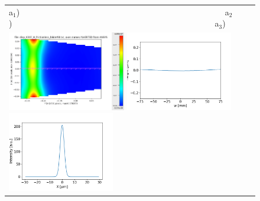 \documentclass[]{spie}  %
\begin{document}
\newpage 

   \begin{figure} [ht]
  \begin{center}
   \begin{tabular}{l} 
   a$_1$)~~~~~~~~~~~~~~~~~~~~~~~~~~~~~~~~~~~~~~~~~~~~~~~~~
   a$_2$)~~~~~~~~~~~~~~~~~~~~~~~~~~~~~~~~~~~~~~~~~~~~~~~~~a$_3$)\\
   \includegraphics[height=3.5cm]{figures/cryogenic2d.png} 
   \includegraphics[height=3.5cm]{figures/deformationcryogenic1d.png}
   \includegraphics[height=3.5cm]{figures/intensitycryogenic.png} \\


\end{tabular}
\end{center}
\end{figure}
\end{document}
